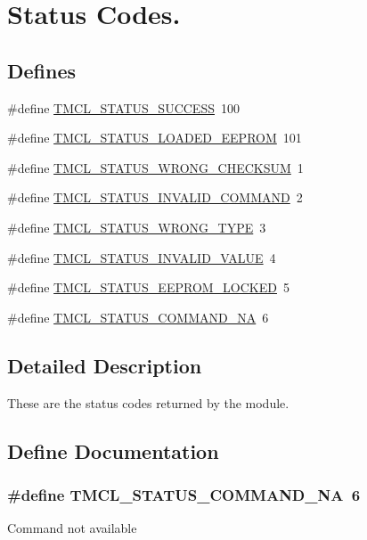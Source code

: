 \hypertarget{group__StatusCodes}{
\section{Status Codes.}
\label{group__StatusCodes}
}
\subsection*{Defines}
\begin{DoxyCompactItemize}
\item 
\#define \hyperlink{group__StatusCodes_gae8f0d829c003e2daf2b4d659f10fb365}{TMCL\_\-STATUS\_\-SUCCESS}~100
\item 
\#define \hyperlink{group__StatusCodes_gae781af2133cc40ed37e50627769f75f3}{TMCL\_\-STATUS\_\-LOADED\_\-EEPROM}~101
\item 
\#define \hyperlink{group__StatusCodes_gaf588b372da14d242fc4ecb4e144b5085}{TMCL\_\-STATUS\_\-WRONG\_\-CHECKSUM}~1
\item 
\#define \hyperlink{group__StatusCodes_ga61d064f4c9f910aeb110a92489664d48}{TMCL\_\-STATUS\_\-INVALID\_\-COMMAND}~2
\item 
\#define \hyperlink{group__StatusCodes_ga9fffa59df78430367ff93cabf36f72c6}{TMCL\_\-STATUS\_\-WRONG\_\-TYPE}~3
\item 
\#define \hyperlink{group__StatusCodes_ga0d34bdc73a05adf2c2bc7e6038fb6c64}{TMCL\_\-STATUS\_\-INVALID\_\-VALUE}~4
\item 
\#define \hyperlink{group__StatusCodes_gab3c467b9ae2a256a4d62dd4e7e1922af}{TMCL\_\-STATUS\_\-EEPROM\_\-LOCKED}~5
\item 
\#define \hyperlink{group__StatusCodes_gade3c304cd225d35cad340c7fdff3a801}{TMCL\_\-STATUS\_\-COMMAND\_\-NA}~6
\end{DoxyCompactItemize}


\subsection{Detailed Description}
These are the status codes returned by the module. 

\subsection{Define Documentation}
\hypertarget{group__StatusCodes_gade3c304cd225d35cad340c7fdff3a801}{
\subsubsection[{TMCL\_\-STATUS\_\-COMMAND\_\-NA}]{\setlength{\rightskip}{0pt plus 5cm}\#define TMCL\_\-STATUS\_\-COMMAND\_\-NA~6}}
\label{group__StatusCodes_gade3c304cd225d35cad340c7fdff3a801}
Command not available 

